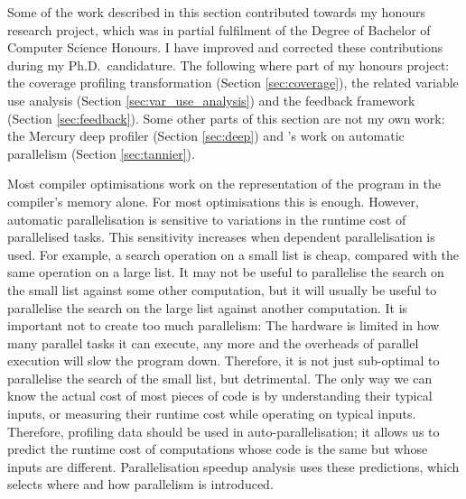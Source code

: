 

Some of the work described in this section contributed towards my honours research project,
which was in partial fulfilment of the Degree of Bachelor of Computer Science
Honours.
I have improved and corrected these contributions during my Ph.D.\
candidature.
The following where part of my honours project:
the coverage profiling transformation (Section \ref{sec:coverage}),
the related variable use analysis (Section \ref{sec:var_use_analysis})
and the feedback framework (Section \ref{sec:feedback}).
Some other parts of this section are not my own work:
the Mercury deep profiler \citep{conway:2001:mercury-deep} (Section
\ref{sec:deep}) and
\citet{tannier:2007:parallel_mercury}'s work on automatic parallelism
(Section \ref{sec:tannier}).

Most compiler optimisations work on the representation of the program in
the compiler's memory alone.
For most optimisations this is enough.
However,
automatic parallelisation is sensitive to variations in the runtime cost of
parallelised tasks.
This sensitivity increases when dependent parallelisation is used.
For example,
a search operation on a small list is cheap, compared with the same operation on
a large list.
It may not be useful to parallelise the search on the small list against some
other computation,
but it will usually be useful to parallelise the search on the large list
against another computation.
It is important not to create too much parallelism:
The hardware is limited in how many parallel tasks it can execute,
any more and the overheads of parallel execution will slow the program down.
Therefore, it is not just sub-optimal to parallelise the search of the small list,
but detrimental.
The only way we can know the actual cost of most pieces of code
is by understanding their typical inputs,
or measuring their runtime cost while operating on typical inputs.
Therefore,
profiling data should be used in auto-parallelisation;
it allows us to predict the runtime cost of computations whose
code is the same but whose inputs are different.
Parallelisation speedup analysis uses these predictions,
which selects where and how parallelism is introduced.

